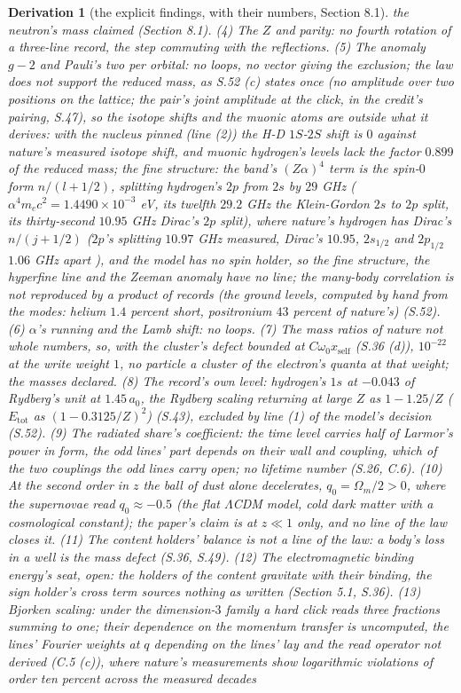\documentclass[pdflatex,sn-mathphys-num]{sn-jnl}
\theoremstyle{thmstyleone}
\newtheorem{derivation}{Derivation}
\begin{document}
\begin{derivation}[the explicit findings, with their numbers, Section 8.1]
the neutron's mass claimed (Section 8.1). (4) The $Z$ and parity: no fourth rotation of a three-line record, the step commuting with the reflections. (5) The anomaly $g - 2$ and Pauli's two per orbital: no loops, no vector giving the exclusion; the law does not support the reduced mass, as S.52 (c) states once (no amplitude over two positions on the lattice; the pair's joint amplitude at the click, in the credit's pairing, S.47), so the isotope shifts and the muonic atoms are outside what it derives: with the nucleus pinned (line (2)) the H-D $1S$-$2S$ shift is $0$ against nature's measured isotope shift, and muonic hydrogen's levels lack the factor $0.899$ of the reduced mass; the fine structure: the band's $(Z\alpha)^4$ term is the spin-$0$ form $n / (l + 1 / 2)$, splitting hydrogen's $2p$ from $2s$ by $29$ GHz ($\alpha^4 m_e c^2 = 1.4490 \times 10^{-3}$ eV, its twelfth $29.2$ GHz the Klein-Gordon $2s$ to $2p$ split, its thirty-second $10.95$ GHz Dirac's $2p$ split), where nature's hydrogen has Dirac's $n / (j + 1 / 2)$ ($2p$'s splitting $10.97$ GHz measured, Dirac's $10.95$, $2s_{1/2}$ and $2p_{1/2}$ $1.06$ GHz apart \cite{bezginov}), and the model has no spin holder, so the fine structure, the hyperfine line and the Zeeman anomaly have no line; the many-body correlation is not reproduced by a product of records (the ground levels, computed by hand from the modes: helium $1.4$ percent short, positronium $43$ percent of nature's) (S.52). (6) $\alpha$'s running and the Lamb shift: no loops. (7) The mass ratios of nature not whole numbers, so, with the cluster's defect bounded at $C\omega_0 x_{\mathrm{self}}$ (S.36 (d)), $10^{-22}$ at the write weight $1$, no particle a cluster of the electron's quanta at that weight; the masses declared. (8) The record's own level: hydrogen's $1s$ at $-0.043$ of Rydberg's unit at $1.45\,a_0$, the Rydberg scaling returning at large $Z$ as $1 - 1.25 / Z$ ($E_{\mathrm{tot}}$ as $(1 - 0.3125 / Z)^2$) (S.43), excluded by line (1) of the model's decision (S.52). (9) The radiated share's coefficient: the time level carries half of Larmor's power in form, the odd lines' part depends on their wall and coupling, which of the two couplings the odd lines carry open; no lifetime number (S.26, C.6). (10) At the second order in $z$ the ball of dust alone decelerates, $q_0 = \Omega_m / 2 > 0$, where the supernovae read $q_0 \approx -0.5$ \cite{riess}\cite{perlmutter} (the flat $\Lambda$CDM model, cold dark matter with a cosmological constant); the paper's claim is at $z \ll 1$ only, and no line of the law closes it. (11) The content holders' balance is not a line of the law: a body's loss in a well is the mass defect (S.36, S.49). (12) The electromagnetic binding energy's seat, open: the holders of the content gravitate with their binding, the sign holder's cross term sources nothing as written (Section 5.1, S.36). (13) Bjorken scaling: under the dimension-$3$ family a hard click reads three fractions summing to one; their dependence on the momentum transfer is uncomputed, the lines' Fourier weights at $q$ depending on the lines' lay and the read operator not derived (C.5 (c)), where nature's measurements show logarithmic violations of order ten percent across the measured decades 
\end{derivation}
\end{document}

